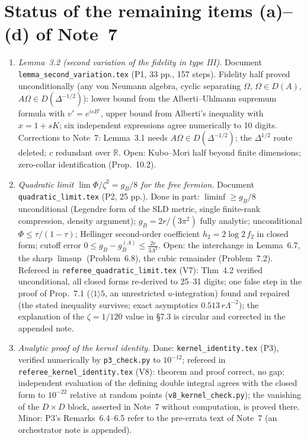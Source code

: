 \section{Status of the remaining items (a)--(d) of Note~7}
\begin{enumerate}[leftmargin=1.6em]
\item[(a)] \emph{Lemma~3.2 (second variation of the fidelity in type III).} Document \texttt{lemma\_second\_variation.tex} (P1, 33 pp., 157 steps). Fidelity half proved unconditionally (any von Neumann algebra, cyclic separating $\Omega$, $\Omega\in D(A)$, $A\Omega\in D(\Delta^{-1/2})$): lower bound from the Alberti--Uhlmann supremum formula with $v'=e^{isB'}$, upper bound from Alberti's inequality with $x=1+sK$; six independent expressions agree numerically to 10 digits. Corrections to Note~7: Lemma~3.1 needs $A\Omega\in D(\Delta^{-1/2})$; the $\Delta^{1/2}$ route deleted; $c$ redundant over $\mathbb R$. Open: Kubo--Mori half beyond finite dimensions; zero-collar identification (Prop.~10.2).
\item[(b)] \emph{Quadratic limit $\lim\Phi/\zeta^2=g_B/8$ for the free fermion.} Document \texttt{quadratic\_limit.tex} (P2, 25 pp.). Done in part: $\liminf\ge g_B/8$ unconditional (Legendre form of the SLD metric, single finite-rank compression, density argument); $g_B=2r/(3\pi^2)$ fully analytic; unconditional $\Phi\le\tau/(1-\tau)$; Hellinger second-order coefficient $h_2=2\log2\,f_2$ in closed form; cutoff error $0\le g_B-g_B^{(\Lambda)}\le\frac{2r}{3\Lambda^2}$. Open: the interchange in Lemma~6.7, the sharp $\limsup$ (Problem~6.8), the cubic remainder (Problem~7.2). Refereed in \texttt{referee\_quadratic\_limit.tex} (V7): Thm~4.2 verified unconditional, all closed forms re-derived to 25--31 digits; one false step in the proof of Prop.~7.1 ($\langle1\rangle5$, an unrestricted $u$-integration) found and repaired (the stated inequality survives; exact asymptotics $0.513\,r\Lambda^{-2}$); the explanation of the $\zeta=1/120$ value in \S7.3 is circular and corrected in the appended note.
\item[(c)] \emph{Analytic proof of the kernel identity.} Done: \texttt{kernel\_identity.tex} (P3), verified numerically by \texttt{p3\_check.py} to $10^{-12}$; refereed in \texttt{referee\_kernel\_identity.tex} (V8): theorem and proof correct, no gap; independent evaluation of the defining double integral agrees with the closed form to $10^{-22}$ relative at random points (\texttt{v8\_kernel\_check.py}); the vanishing of the $D\times D$ block, asserted in Note~7 without computation, is proved there. Minor: P3's Remarks~6.4--6.5 refer to the pre-errata text of Note~7 (an orchestrator note is appended).

\end{enumerate}
